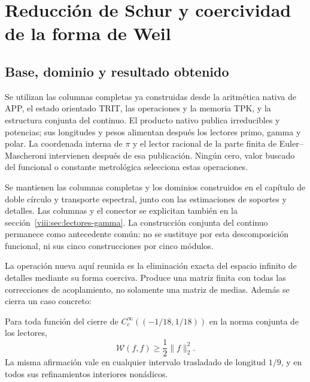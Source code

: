 \clearpage
\section{Reducción de Schur y coercividad de la forma de Weil}
\label{viii:sec:schur-coercividad}


\subsection{Base, dominio y resultado obtenido}
\label{viii:schur-add-sub-6}

Se utilizan las columnas completas ya construidas desde la aritmética nativa
de APP, el estado orientado TRIT, las operaciones y la memoria TPK, y la
estructura conjunta del continuo. El producto nativo publica irreducibles y
potencias; sus longitudes y pesos alimentan después los lectores primo,
gamma y polar. La coordenada interna de \(\pi\) y el lector racional de la parte
finita de Euler--Mascheroni intervienen después de esa publicación. Ningún
cero, valor buscado del funcional o constante metrológica selecciona estas
operaciones.

Se mantienen las columnas completas y los dominios construidos en el
capítulo de doble círculo y transporte espectral, junto con las estimaciones
de soportes y detalles. Las columnas y el conector se explicitan también en
la sección~\ref{viii:sec:lectores-gamma}. La construcción conjunta
del continuo permanece como antecedente común: no se sustituye por esta
descomposición funcional, ni sus cinco construcciones por cinco módulos.

La operación nueva aquí reunida es la eliminación exacta del espacio
infinito de detalles mediante su forma coerciva. Produce una matriz finita
con todas las correcciones de acoplamiento, no solamente una matriz de
medias. Además se cierra un caso concreto:

Para toda función del cierre de
\(C_c^\infty((-1/18,1/18))\) en la norma conjunta de los lectores,
\begin{equation}
\mathscr W(f,f)\geq\frac12\|f\|_2^2.
\label{viii:schur-add-display-1}
\end{equation}
La misma afirmación vale en cualquier intervalo trasladado de longitud
\(1/9\), y en todos sus refinamientos interiores nonádicos.

